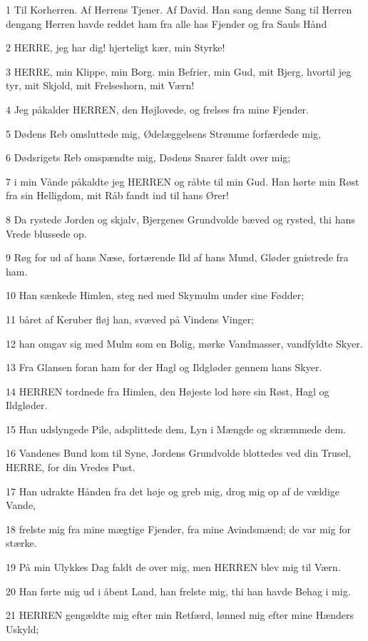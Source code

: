 \par 1 Til Korherren. Af Herrens Tjener. Af David. Han sang denne Sang til Herren dengang Herren havde reddet ham fra alle has Fjender og fra Sauls Hånd
\par 2 HERRE, jeg har dig! hjerteligt kær, min Styrke!
\par 3 HERRE, min Klippe, min Borg. min Befrier, min Gud, mit Bjerg, hvortil jeg tyr, mit Skjold, mit Frelseshorn, mit Værn!
\par 4 Jeg påkalder HERREN, den Højlovede, og frelses fra mine Fjender.
\par 5 Dødens Reb omsluttede mig, Ødelæggelsens Strømme forfærdede mig,
\par 6 Dødsrigets Reb omspændte mig, Dødens Snarer faldt over mig;
\par 7 i min Vånde påkaldte jeg HERREN og råbte til min Gud. Han hørte min Røst fra sin Helligdom, mit Råb fandt ind til hans Ører!
\par 8 Da rystede Jorden og skjalv, Bjergenes Grundvolde bæved og rysted, thi hans Vrede blussede op.
\par 9 Røg for ud af hans Næse, fortærende Ild af hans Mund, Gløder gnistrede fra ham.
\par 10 Han sænkede Himlen, steg ned med Skymulm under sine Fødder;
\par 11 båret af Keruber fløj han, svæved på Vindens Vinger;
\par 12 han omgav sig med Mulm som en Bolig, mørke Vandmasser, vandfyldte Skyer.
\par 13 Fra Glansen foran ham for der Hagl og Ildgløder gennem hans Skyer.
\par 14 HERREN tordnede fra Himlen, den Højeste lod høre sin Røst, Hagl og Ildgløder.
\par 15 Han udslyngede Pile, adsplittede dem, Lyn i Mængde og skræmmede dem.
\par 16 Vandenes Bund kom til Syne, Jordens Grundvolde blottedes ved din Trusel, HERRE, for din Vredes Pust.
\par 17 Han udrakte Hånden fra det høje og greb mig, drog mig op af de vældige Vande,
\par 18 frelste mig fra mine mægtige Fjender, fra mine Avindsmænd; de var mig for stærke.
\par 19 På min Ulykkes Dag faldt de over mig, men HERREN blev mig til Værn.
\par 20 Han førte mig ud i åbent Land, han frelste mig, thi han havde Behag i mig.
\par 21 HERREN gengældte mig efter min Retfærd, lønned mig efter mine Hænders Uskyld;
